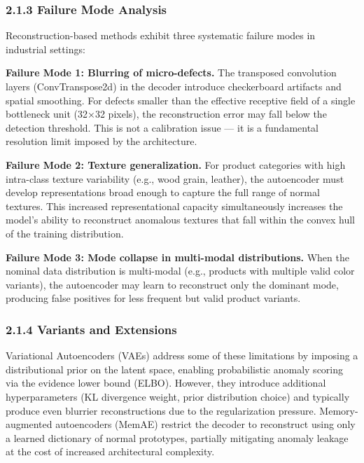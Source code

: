 \subsubsection{2.1.3 Failure Mode Analysis}\label{failure-mode-analysis}

Reconstruction-based methods exhibit three systematic failure modes in industrial settings:

\textbf{Failure Mode 1: Blurring of micro-defects.} The transposed convolution layers (ConvTranspose2d) in the decoder introduce checkerboard artifacts and spatial smoothing. For defects smaller than the effective receptive field of a single bottleneck unit (32×32 pixels), the reconstruction error may fall below the detection threshold. This is not a calibration issue --- it is a fundamental resolution limit imposed by the architecture.

\textbf{Failure Mode 2: Texture generalization.} For product categories with high intra-class texture variability (e.g., wood grain, leather), the autoencoder must develop representations broad enough to capture the full range of normal textures. This increased representational capacity simultaneously increases the model's ability to reconstruct anomalous textures that fall within the convex hull of the training distribution.

\textbf{Failure Mode 3: Mode collapse in multi-modal distributions.} When the nominal data distribution is multi-modal (e.g., products with multiple valid color variants), the autoencoder may learn to reconstruct only the dominant mode, producing false positives for less frequent but valid product variants.

\subsubsection{2.1.4 Variants and Extensions}\label{variants-and-extensions}

Variational Autoencoders (VAEs) address some of these limitations by imposing a distributional prior on the latent space, enabling probabilistic anomaly scoring via the evidence lower bound (ELBO). However, they introduce additional hyperparameters (KL divergence weight, prior distribution choice) and typically produce even blurrier reconstructions due to the regularization pressure. Memory-augmented autoencoders (MemAE) restrict the decoder to reconstruct using only a learned dictionary of normal prototypes, partially mitigating anomaly leakage at the cost of increased architectural complexity.

